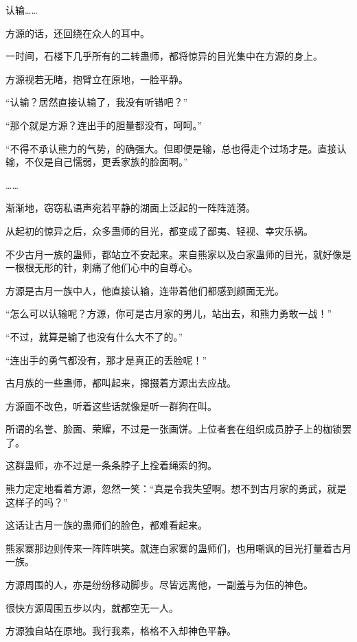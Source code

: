 
\begin{this_body}

认输……

方源的话，还回绕在众人的耳中。

一时间，石楼下几乎所有的二转蛊师，都将惊异的目光集中在方源的身上。

方源视若无睹，抱臂立在原地，一脸平静。

“认输？居然直接认输了，我没有听错吧？”

“那个就是方源？连出手的胆量都没有，呵呵。”

“不得不承认熊力的气势，的确强大。但即便是输，总也得走个过场才是。直接认输，不仅是自己懦弱，更丢家族的脸面啊。”

……

渐渐地，窃窃私语声宛若平静的湖面上泛起的一阵阵涟漪。

从起初的惊异之后，众多蛊师的目光，都变成了鄙夷、轻视、幸灾乐祸。

不少古月一族的蛊师，都站立不安起来。来自熊家以及白家蛊师的目光，就好像是一根根无形的针，刺痛了他们心中的自尊心。

方源是古月一族中人，他直接认输，连带着他们都感到颜面无光。

“怎么可以认输呢？方源，你可是古月家的男儿，站出去，和熊力勇敢一战！”

“不过，就算是输了也没有什么大不了的。”

“连出手的勇气都没有，那才是真正的丢脸呢！”

古月族的一些蛊师，都叫起来，撺掇着方源出去应战。

方源面不改色，听着这些话就像是听一群狗在叫。

所谓的名誉、脸面、荣耀，不过是一张画饼。上位者套在组织成员脖子上的枷锁罢了。

这群蛊师，亦不过是一条条脖子上拴着绳索的狗。

熊力定定地看着方源，忽然一笑：“真是令我失望啊。想不到古月家的勇武，就是这样子的吗？”

这话让古月一族的蛊师们的脸色，都难看起来。

熊家寨那边则传来一阵阵哄笑。就连白家寨的蛊师们，也用嘲讽的目光打量着古月一族。

方源周围的人，亦是纷纷移动脚步。尽皆远离他，一副羞与为伍的神色。

很快方源周围五步以内，就都空无一人。

方源独自站在原地。我行我素，格格不入却神色平静。


\end{this_body}
